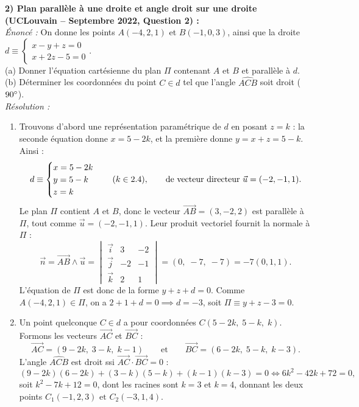 \begin{exemple}
\medskip
\textbf{2) Plan parallèle à une droite et angle droit sur une droite (UCLouvain -- Septembre 2022, Question 2) :}\\
\emph{Énoncé :} On donne les points $A(-4, 2, 1)$ et $B(-1, 0, 3)$, ainsi que la droite $d \equiv \begin{cases} x - y + z = 0 \\ x + 2z - 5 = 0 \end{cases}$.\\
(a) Donner l'équation cartésienne du plan $\Pi$ contenant $A$ et $B$ et parallèle à $d$.\\
(b) Déterminer les coordonnées du point $C \in d$ tel que l'angle $\widehat{ACB}$ soit droit ($90\degree$).\\
\emph{Résolution :}
\begin{enumerate}[label=(\alph*)]
    \item Trouvons d'abord une représentation paramétrique de $d$ en posant $z = k$ : la seconde équation donne $x = 5 - 2k$, et la première donne $y = x + z = 5 - k$. Ainsi :
    \[
        d \equiv \begin{cases} x = 5 - 2k \\ y = 5 - k \\ z = k \end{cases} \quad (k \in 2.4), \qquad \text{de vecteur directeur } \vec{u} = (-2, -1, 1).
    \]
    Le plan $\Pi$ contient $A$ et $B$, donc le vecteur $\overrightarrow{AB} = (3, -2, 2)$ est parallèle à $\Pi$, tout comme $\vec{u} = (-2, -1, 1)$. Leur produit vectoriel fournit la normale à $\Pi$ :
    \[
        \vec{n} = \overrightarrow{AB} \wedge \vec{u} = \begin{vmatrix} \vec{i} & 3 & -2 \\ \vec{j} & -2 & -1 \\ \vec{k} & 2 & 1 \end{vmatrix} = (0,\; -7,\; -7) = -7(0, 1, 1).
    \]
    L'équation de $\Pi$ est donc de la forme $y + z + d = 0$. Comme $A(-4, 2, 1) \in \Pi$, on a $2 + 1 + d = 0 \implies d = -3$, soit $\boxed{\Pi \equiv y + z - 3 = 0}$.
    \item Un point quelconque $C \in d$ a pour coordonnées $C(5-2k,\; 5-k,\; k)$. Formons les vecteurs $\overrightarrow{AC}$ et $\overrightarrow{BC}$ :
    \[
        \overrightarrow{AC} = (9-2k,\; 3-k,\; k-1) \qquad \text{et} \qquad \overrightarrow{BC} = (6-2k,\; 5-k,\; k-3).
    \]
    L'angle $\widehat{ACB}$ est droit ssi $\overrightarrow{AC} \cdot \overrightarrow{BC} = 0$ :
    \[
        (9-2k)(6-2k) + (3-k)(5-k) + (k-1)(k-3) = 0 \iff 6k^2 - 42k + 72 = 0,
    \]
    soit $k^2 - 7k + 12 = 0$, dont les racines sont $k = 3$ et $k = 4$, donnant les deux points $\boxed{C_1(-1, 2, 3) \text{ et } C_2(-3, 1, 4)}$.
\end{enumerate}
\end{exemple}

